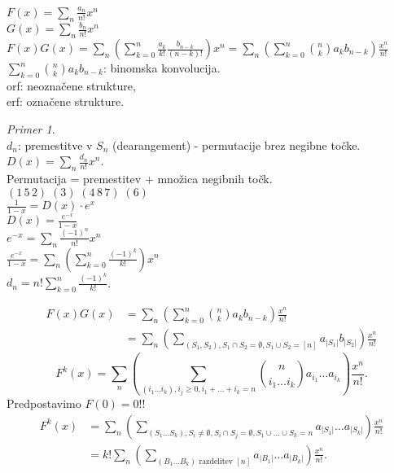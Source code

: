 \documentclass[a4paper, 12pt]{book}
\theoremstyle{definition}
\theoremstyle{remark}
\newtheorem*{ex}{Primer}
\begin{document}
$F(x) = \sum_n \frac{a_n}{n!} x^n$ \\
$G(x) = \sum_n \frac{b_n}{n!} x^n$ \\
$F(x) G(x) = \sum_n \left(\sum_{k=0}^{n} \frac{a_k}{k!} \frac{b_{n-k}}{(n-k)!}\right) x^n =
\sum_n \left(\sum_{k=0}^{n} \binom{n}{k} a_k b_{n-k}\right) \frac{x^n}{n!}$ \\
$\sum_{k=0}^{n} \binom{n}{k} a_k b_{n-k}$: binomska konvolucija. \\
orf: neoznačene strukture, \\
erf: označene strukture.
\begin{ex} \text{} \\
  $d_n$: premestitve v $S_n$ (dearangement) - permutacije brez negibne točke. \\
  $D(x) = \sum_n \frac{d_n}{n!} x^n$. \\
  Permutacija = premestitev + množica negibnih točk. \\
  $(1 \, 5 \, 2) \; (3) \; (4 \, 8 \, 7) \; (6)$ \\
  $\frac{1}{1-x} = D(x) \cdot e^x$ \\
  $D(x) = \frac{e^{-x}}{1-x}$ \\
  $e^{-x} = \sum_n \frac{(-1)^n}{n!} x^n$ \\
  $\frac{e^{-x}}{1-x} = \sum_n \left(\sum_{k=0}^{n} \frac{(-1)^k}{k!}\right) x^n$ \\
  $d_n = n! \sum_{k=0}^{n} \frac{(-1)^k}{k!}$.
\end{ex}
\begin{align*}
  F(x) G(x) &= \sum_{n} \left(\sum_{k=0}^{n} \binom{n}{k} a_k b_{n-k}\right) \frac{x^n}{n!} \\
  &= \sum_n \left(
    \sum_{(S_1,S_2), S_1 \cap S_2 = \emptyset, S_1 \cup S_2 = [n]} a_{|S_1|} b_{|S_2|} 
    \right) \frac{x^n}{n!}
\end{align*}
\begin{equation*}
  F^k(x) = \sum_n \left(
    \sum_{(i_1 \dots i_k), i_j \geq 0, i_1 + \dots + i_k = n}
    \binom{n}{i_1 \dots i_k} a_{i_1} \dots a_{i_k}
    \right) \frac{x^n}{n!}.
\end{equation*}
Predpostavimo $F(0) = 0$!!
\begin{align*}
  F^k(x) &= \sum_n \left(
    \sum_{(S_1 \dots S_k), S_i \neq \emptyset, S_i \cap S_j = \emptyset, S_1 \cup \dots \cup S_k = n}
    a_{|S_1|} \dots a_{|S_k|}
    \right) \frac{x^n}{n!} \\
  &= k! \sum_n \left(
    \sum_{(B_1 \dots B_k) \text{ razdelitev } [n]}
    a_{|B_1|} \dots a_{|B_k|}
    \right) \frac{x^n}{n!}.
\end{align*}
\end{document}
